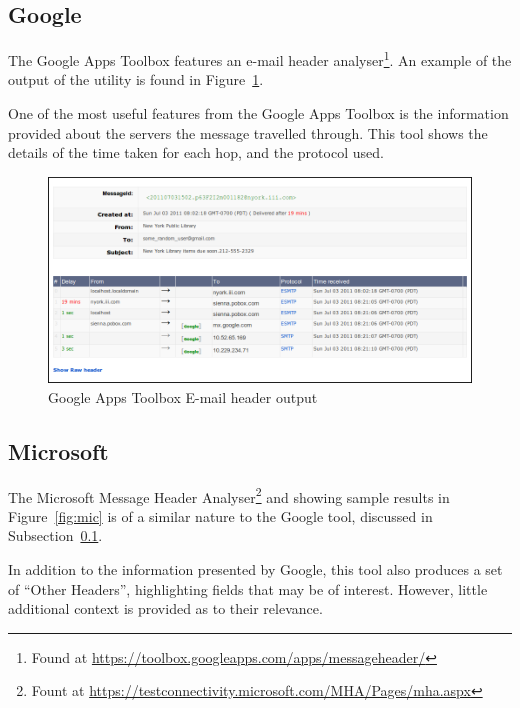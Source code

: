 \subsection{Google}\label{sec:goo}

The Google Apps Toolbox features an e-mail header analyser\footnote{Found at
	\url{https://toolbox.googleapps.com/apps/messageheader/}}. An example
of the output of the utility is found in Figure~\ref{fig:goo}.

One of the most useful features from the Google Apps Toolbox is the information
provided about the servers the message travelled through.  This tool shows the
details of the time taken for each hop, and the protocol used.

\begin{figure}
	
	\centering
	\includegraphics[width=0.9\linewidth]{google-header}

	\caption{Google Apps Toolbox E-mail header output} \label{fig:goo}\end{figure}

\subsection{Microsoft}\label{sec:mic}

The Microsoft Message Header Analyser\footnote{Fount at
	\url{https://testconnectivity.microsoft.com/MHA/Pages/mha.aspx}} and
showing sample results in Figure~\ref{fig:mic} is of a similar nature to the Google tool, discussed in Subsection~\ref{sec:goo}.  

In addition to the information presented by Google, this tool also produces a set of ``Other Headers'', highlighting fields that may be of interest.  However, little additional context is provided as to their relevance.

